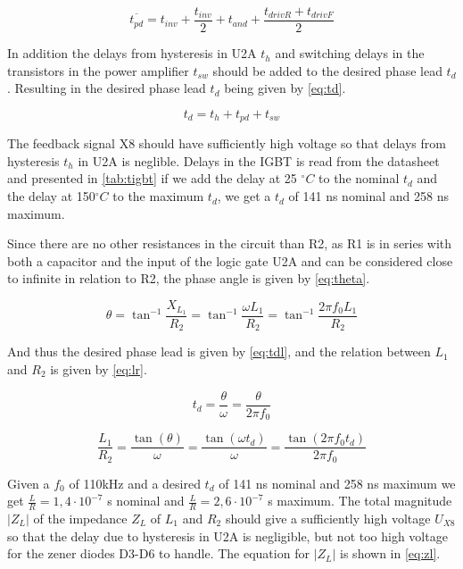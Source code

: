 \begin{equation} \label{eq:tpd}
    \overline{t_{pd}} = t_{inv} + \frac{t_{inv}}{2} + t_{and} + \frac{t_{driv R}+t_{driv F}}{2}
\end{equation}

In addition the delays from hysteresis in U2A $t_h$ and switching delays in the transistors in the power amplifier $t_{sw}$ should be added to the desired phase lead $t_{d}$. Resulting in the desired phase lead $t_{d}$ being given by \cref{eq:td}.

\begin{equation} \label{eq:td}
    t_d = t_{h} + t_{pd} + t_{sw}
\end{equation}

The feedback signal X8 should have sufficiently high voltage so that delays from hysteresis $t_h$ in U2A is neglible. Delays in the IGBT is read from the datasheet and presented in \cref{tab:tigbt} if we add the delay at 25 $^{\circ}C$ to the nominal $t_d$ and the delay at 150$^{\circ}C$ to the maximum $t_d$, we get a $t_d$ of 141 ns nominal and 258 ns maximum.

Since there are no other resistances in the circuit than R2, as R1 is in series with both a capacitor and the input of the logic gate U2A and can be considered close to infinite in relation to R2, the phase angle is given by \cref{eq:theta}.

\begin{equation} \label{eq:theta}
    \theta = {\tan}^{-1}\frac{X_{L_1}}{R_2} = {\tan}^{-1}\frac{\omega L_1}{R_2} = {\tan}^{-1}\frac{2 \pi f_0 L_1}{R_2}
\end{equation}

And thus the desired phase lead is given by \cref{eq:tdl}, and the relation between $L_1$ and $R_2$ is given by \cref{eq:lr}.

\begin{equation} \label{eq:tdl}
    t_{d} = \frac{\theta}{\omega} = \frac{\theta}{2 \pi f_0}
\end{equation}

\begin{equation} \label{eq:lr}
    \frac{L_1}{R_2} = \frac{\tan(\theta)}{\omega} = \frac{\tan(\omega t_{d})}{\omega} = \frac{\tan(2 \pi f_0 t_{d})}{2 \pi f_0}
\end{equation}

Given a $f_0$ of 110kHz and a desired $t_d$ of 141 ns nominal and 258 ns maximum we get $\frac{L}{R} = 1,4 \cdot 10^{-7}$ s nominal and $\frac{L}{R} = 2,6 \cdot 10^{-7}$ s maximum. The total magnitude $|Z_L|$ of the impedance $Z_{L}$ of $L_1$ and $R_2$ should give a sufficiently high voltage $U_{X8}$ so that the delay due to hysteresis in U2A is negligible, but not too high voltage for the zener diodes D3-D6 to handle. The equation for $|Z_L|$ is shown in \cref{eq:zl}.


